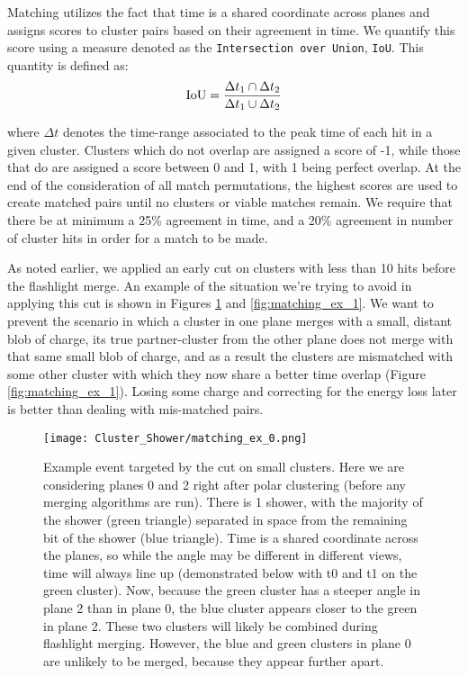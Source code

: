 \par Matching utilizes the fact that time is a shared coordinate across planes and assigns scores to cluster pairs based on their agreement in time. We quantify this score using a measure denoted as the \texttt{Intersection over Union}, \texttt{IoU}. This quantity is defined as:
\begin{equation}
  {\rm IoU} = \frac{ \Delta t_1 \cap \Delta t_2  }{ \Delta t_1 \cup \Delta t_2 }
\end{equation}

\noindent where $\Delta t$ denotes the time-range associated to the peak time of each hit in a given cluster.  Clusters which do not overlap are assigned a score of -1, while those that do are assigned a score between 0 and 1, with 1 being perfect overlap. At the end of the consideration of all match permutations, the highest scores are used to create matched pairs until no clusters or viable matches remain. We require that there be at minimum a 25\% agreement in time, and a 20\% agreement in number of cluster hits in order for a match to be made. 
\par As noted earlier, we applied an early cut on clusters with less than 10 hits before the flashlight merge. An example of the situation we're trying to avoid in applying this cut is shown in Figures \ref{fig:matching_ex_0} and \ref{fig:matching_ex_1}.  We want to prevent the scenario in which a cluster in one plane merges with a small, distant blob of charge, its true partner-cluster from the other plane does not merge with that same small blob of charge, and as a result the clusters are mismatched with some other cluster with which they now share a better time overlap (Figure \ref{fig:matching_ex_1}). Losing some charge and correcting for the energy loss later is better than dealing with mis-matched pairs.

\begin{figure}[H]
\centering
\texttt{[image: Cluster\_Shower/matching\_ex\_0.png]}
\caption{Example event targeted by the cut on small clusters. Here we are considering planes 0 and 2 right after polar clustering (before any merging algorithms are run).  There is 1 shower, with the majority of the shower (green triangle) separated in space from the remaining bit of the shower (blue triangle).  Time is a shared coordinate across the planes, so while the angle may be different in different views, time will always line up (demonstrated below with t0 and t1 on the green cluster).  Now, because the green cluster has a steeper angle in plane 2 than in plane 0, the blue cluster appears closer to the green in plane 2.  These two clusters will likely be combined during flashlight merging.  However, the blue and green clusters in plane 0 are unlikely to be merged,  because they appear further apart. }
\label{fig:matching_ex_0}
\end{figure}

